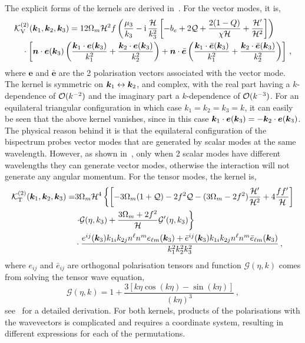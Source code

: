 The explicit forms of the kernels are derived in~\cite{Jolicoeur:2018blf}. For the vector modes, it is, 
\begin{align}
	&\mathcal{K}^{(2)}_\mathrm{V}(\bm {k}_1,\bm {k}_2,\bm {k}_3) = 12 \Omega_m \mathcal{H}^2 f \left( \frac{\mu_3}{k_3} - \mathrm{i\,} \frac{\mathcal{H}}{k_3^2} \left[ -b_e + 2\mathcal{Q} + \frac{2(1-Q)}{\chi\mathcal{H}} + \frac{\mathcal{H}'}{\mathcal{H}^2} \right]  \right) \nonumber \\
	&\quad\cdot \left[ \bm {n} \cdot \bm{e}(\bm {k}_3) \left( \frac{\bm {k}_1 \cdot \bm{e}(\bm {k}_3)}{k_1^2} + \frac{\bm {k}_2 \cdot \bm{e}(\bm {k}_3)}{k_2^2} \right) + \bm {n} \cdot \bar{\bm{e}} \left( \frac{\bm {k}_1 \cdot \bar{\bm{e}}(\bm {k}_3) }{k_1^2} +\frac{\bm {k}_2 \cdot \bar{\bm{e}}(\bm {k}_3)}{k_2^2}  \right) \right]\,,
\end{align}
where $\bm{e}$ and $\bar{\bm{e}}$ are the 2 polarisation vectors associated with the vector mode. The kernel is symmetric on $\bm {k}_1 \leftrightarrow \bm {k}_2$, and complex, with the real part having a $k$-dependence of $\mathcal{O}(k^{-2})$ and the imaginary part a $k$-dependence of $\mathcal{O}(k^{-3})$. For an equilateral triangular configuration in which case $k_1 = k_2 = k_3= k$, it can easily be seen that the above kernel vanishes, since in this case $\bm {k}_1 \cdot \bm{e}(\bm {k}_3) = - \bm {k}_2 \cdot \bm{e}(\bm {k}_3)$. The physical reason behind it is that the equilateral configuration of the bispectrum probes vector modes that are generated by scalar modes at the same wavelength. However, as shown in~\cite{Lu:2007cj}, only when 2 scalar modes have different wavelengths they can generate vector modes, otherwise the interaction will not generate any angular momentum.
For the tensor modes, the kernel is, 
\begin{align}
	\mathcal{K}^{(2)}_\mathrm{T}(\bm {k}_1,\bm {k}_2,\bm {k}_3) =& 3 \Omega_m \mathcal{H}^4 \left\{ \left[ - 3 \Omega_m (1 + \mathcal{Q}) - 2 f^2 \mathcal{Q} - (3 \Omega_m - 2 f^2) \frac{\mathcal{H}'}{\mathcal{H}^2} + 4 \frac{f f'}{\mathcal{H}} \right] \right. \nonumber \\
	&\left. \cdot \mathcal{G}(\eta,k_3) + \frac{3 \Omega_m + 2 f^2}{\mathcal{H}} \mathcal{G}'(\eta, k_3) \right\} \nonumber \\
	&\cdot \frac{e^{ij}(\bm {k}_3) k_{1i} k_{2j} n^{\ell} n^m e_{\ell m}(\bm {k}_3) + \bar{e}^{ij}(\bm {k}_3) k_{1i} k_{2j} n^{\ell} n^m \bar{e}_{\ell m}(\bm {k}_3)  }{k_1^2 k_2^2 k_3^2}\,,
\end{align}
where $e_{ij}$ and $\bar{e}_{ij}$ are orthogonal polarisation tensors and function $\mathcal{G}(\eta,k)$ comes from solving the tensor wave equation, 
\begin{equation}
	\mathcal{G}(\eta,k) = 1 + \frac{3 \left[ k \eta \cos(k\eta) - \sin(k\eta) \right]}{(k\eta)^3}\,,
\end{equation}
see~\cite{Jolicoeur:2018blf} for a detailed derivation. For both kernels, products of the polarisations with the wavevectors is complicated and requires a coordinate system, resulting in different expressions for each of the permutations.

